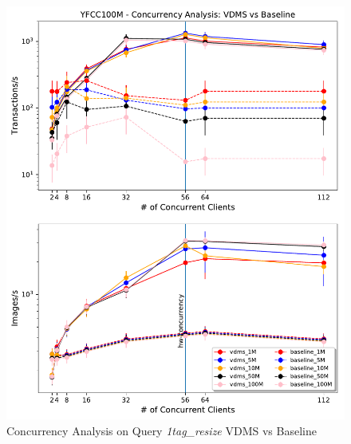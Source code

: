 \begin{figure}[]
\centering
\includegraphics[width=\columnwidth]{figures/concurrency_comparison}
\caption{Concurrency Analysis on Query \textit{1tag\_resize} \- VDMS vs Baseline}
\label{fig:concurrency_comparison}
\end{figure}



